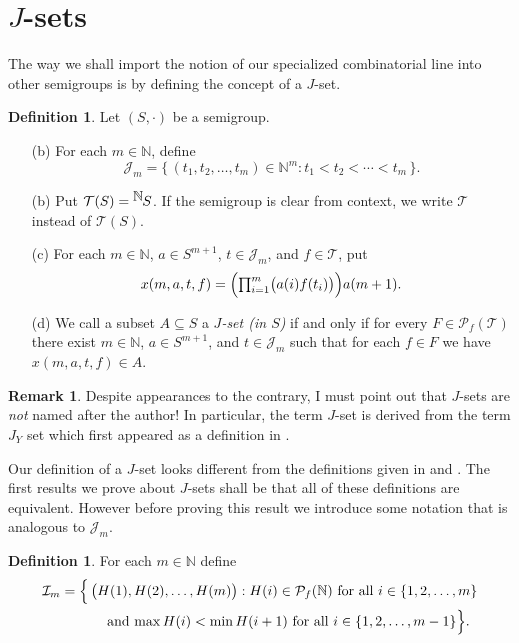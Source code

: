 \documentclass[12pt,showtrims]{memoir}
\theoremstyle{plain}
\theoremstyle{definition}
\newtheorem{defn}[thm]{Definition}
\newtheorem{rmk}[thm]{Remark}
\newcommand{\bbN}{\mathbb{N}}
\newcommand{\calI}{\mathcal{I}}
\newcommand{\calJ}{\mathcal{J}}
\newcommand{\calT}{\mathcal{T}}
\newcommand{\Pf}{\mathcal{P}_f}
\newcommand{\setfunc}[2]{\hbox{${}^{\hbox{$#1$}}\hskip -1 pt #2$}}
\begin{document}
\section{$J$-sets}
The way we shall import the notion of our specialized combinatorial line into other semigroups is by defining the concept of a $J$-set. 

\begin{defn}
  Let $(S, \cdot)$ be a semigroup.
  \begin{itemize}
    \item[(b)] 
      For each $m \in \bbN$, define
      \[
        \calJ_m = \{\, (t_1, t_2, \ldots, t_m) \in \bbN^m : t_1 < t_2 < \cdots < t_m \,\}.
      \]

    \item[(b)] 
      Put $\calT(S) = \setfunc{\bbN}{S}$.
      If the semigroup is clear from context, we write $\calT$ instead of $\calT(S)$.

    \item[(c)] 
      For each $m \in \bbN$, $a \in S^{m+1}$, $t \in \calJ_m$, and $f \in \calT$, put
      \[
        \textstyle
        x(m, a, t, f) = \Bigl( \prod_{i=1}^m \bigl( a(i)f(t_i) \bigr) \Bigr)a(m+1).
      \]

    \item[(d)] 
      We call a subset $A \subseteq S$ a \emph{$J$-set (in $S$)} if and only if for every $F \in \Pf(\calT)$ there exist $m \in \bbN$, $a \in S^{m+1}$, and $t \in \calJ_m$ such that for each $f \in F$ we have $x(m, a, t, f) \in A$.
  \end{itemize}
\end{defn}
\begin{rmk}
  Despite appearances to the contrary, I must point out that $J$-sets are \textsl{not} named after the author!
  In particular, the term $J$-set is derived from the term $J_Y$ set which first appeared as a definition in \cite[Definition 2.4(b)]{Hindman:1996fk}.
\end{rmk}

Our definition of a $J$-set looks different from the definitions given in \cite[Definition 2.2(a)]{Hindman:2009vn} and \cite[Definition 3.3(d)]{De:2008uq}.
The first results we prove about $J$-sets shall be that all of these definitions are equivalent.
However before proving this result we introduce some notation that is analogous to $\calJ_m$.

\begin{defn}
  For each $m \in \bbN$ define
  \begin{align*}
    \calI_m &= \Bigl\{\, \bigl( H(1), H(2), \ldots, H(m) \bigr) : \hbox{$H(i) \in \mathcal{P}_f(\bbN)$ for all $i \in \{1, 2, \ldots, m\}$} \\
        &\hspace{3em} \hbox{ and $\max H(i) < \min H(i+1)$ for all $i \in \{1, 2, \ldots, m-1\}$} \Bigr\}.
  \end{align*}
\end{defn}
\end{document}
